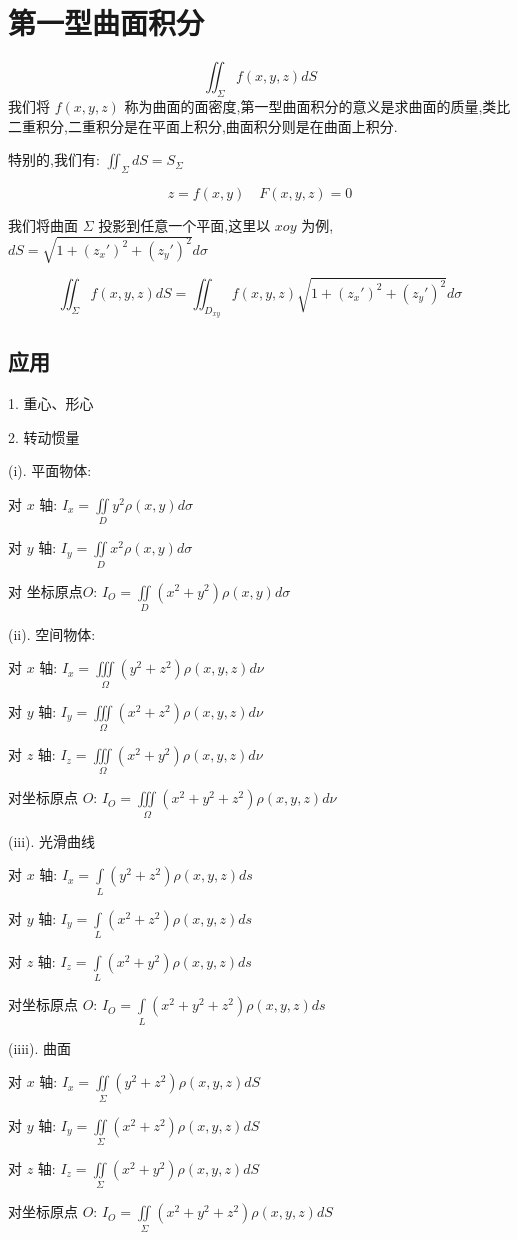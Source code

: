 \section{第一型曲面积分}
\begin{definition}[第一型曲面积分]
	$$\iint_{\Sigma}f(x,y,z)dS$$
	我们将 $f(x,y,z)$ 称为曲面的面密度,第一型曲面积分的意义是求曲面的质量,类比二重积分,二重积分是在平面上积分,曲面积分则是在曲面上积分.
	
	特别的,我们有: $\iint_{\Sigma}dS=S_{\Sigma}$
\end{definition}
\begin{theorem}
	$$z=f(x,y)\quad F(x,y,z)=0$$
	
	我们将曲面 $\Sigma$ 投影到任意一个平面,这里以 $xoy$ 为例,$dS=\sqrt{1+(z_{x}')^2+(z_{y}')^2}d\sigma$
	
	$$\iint_{\Sigma}f(x,y,z)dS=\iint_{D_{xy}}f(x,y,z)\sqrt{1+(z_{x}')^2+(z_{y}')^2}d\sigma$$
\end{theorem}
\subsection{应用}
1. 重心、形心

2. 转动惯量
\begin{definition}[转动惯量: $I=mr^2$]
	
	(i). 平面物体: 
	
	对 $x$ 轴: $I_{x}=\iint\limits_{D}y^2\rho(x,y)d\sigma$
	
	对 $y$ 轴: $I_{y}=\iint\limits_{D}x^2\rho(x,y)d\sigma$
	
	对 坐标原点$O$: $I_{O}=\iint\limits_{D}(x^2+y^2)\rho(x,y)d\sigma$
	
	(ii). 空间物体: 
	
	对 $x$ 轴: $I_{x}=\iiint\limits_{\Omega}(y^2+z^2)\rho(x,y,z)d\nu$
	
	对 $y$ 轴: $I_{y}=\iiint\limits_{\Omega}(x^2+z^2)\rho(x,y,z)d\nu$
	
	对 $z$ 轴: $I_{z}=\iiint\limits_{\Omega}(x^2+y^2)\rho(x,y,z)d\nu$
	
	对坐标原点 $O$: $I_{O}=\iiint\limits_{\Omega}(x^2+y^2+z^2)\rho(x,y,z)d\nu$
	
	(iii). 光滑曲线
	
	对 $x$ 轴: $I_{x}=\int\limits_{L}(y^2+z^2)\rho(x,y,z)ds$
	
	对 $y$ 轴: $I_{y}=\int\limits_{L}(x^2+z^2)\rho(x,y,z)ds$
	
	对 $z$ 轴: $I_{z}=\int\limits_{L}(x^2+y^2)\rho(x,y,z)ds$
	
	对坐标原点 $O$: $I_{O}=\int\limits_{L}(x^2+y^2+z^2)\rho(x,y,z)ds$
	
	(iiii). 曲面
	
	对 $x$ 轴: $I_{x}=\iint\limits_{\Sigma}(y^2+z^2)\rho(x,y,z)dS$
	
	对 $y$ 轴: $I_{y}=\iint\limits_{\Sigma}(x^2+z^2)\rho(x,y,z)dS$
	
	对 $z$ 轴: $I_{z}=\iint\limits_{\Sigma}(x^2+y^2)\rho(x,y,z)dS$
	
	对坐标原点 $O$: $I_{O}=\iint\limits_{\Sigma}(x^2+y^2+z^2)\rho(x,y,z)dS$
	
\end{definition}

